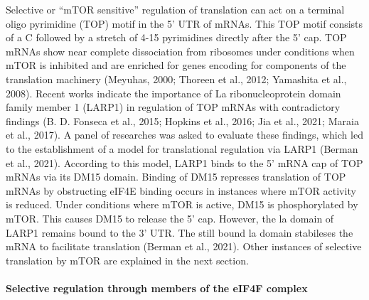 \documentclass[12pt,openany]{book}
\begin{document}
Selective or ``mTOR sensitive'' regulation of translation can act on a
terminal oligo pyrimidine (TOP) motif in the 5' UTR of mRNAs. This TOP
motif consists of a C followed by a stretch of 4-15 pyrimidines directly
after the 5' cap. TOP mRNAs show near complete dissociation from
ribosomes under conditions when mTOR is inhibited and are enriched for
genes encoding for components of the translation machinery (Meyuhas,
2000; Thoreen et al., 2012; Yamashita et al., 2008). Recent works
indicate the importance of La ribonucleoprotein domain family member 1
(LARP1) in regulation of TOP mRNAs with contradictory findings (B. D.
Fonseca et al., 2015; Hopkins et al., 2016; Jia et al., 2021; Maraia et
al., 2017). A panel of researches was asked to evaluate these findings,
which led to the establishment of a model for translational regulation
via LARP1 (Berman et al., 2021). According to this model, LARP1 binds to
the 5' mRNA cap of TOP mRNAs via its DM15 domain. Binding of DM15
represses translation of TOP mRNAs by obstructing eIF4E binding occurs
in instances where mTOR activity is reduced. Under conditions where mTOR
is active, DM15 is phosphorylated by mTOR. This causes DM15 to release
the 5' cap. However, the la domain of LARP1 remains bound to the 3' UTR.
The still bound la domain stabileses the mRNA to facilitate translation
(Berman et al., 2021). Other instances of selective translation by mTOR
are explained in the next section.

\paragraph{Selective regulation through members of the eIF4F complex} \label{sel4F}
\end{document}
